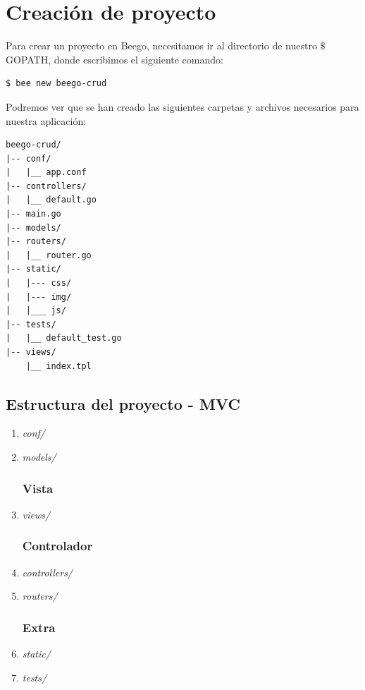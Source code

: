 \documentclass[12pt]{article}
\begin{document}
\section{Creación de proyecto}\label{sec:proy}
\noindent Para crear un proyecto en Beego, necesitamos ir al directorio de nuestro $\$$GOPATH, donde escribimos el siguiente comando:
\begin{verbatim}
$ bee new beego-crud
\end{verbatim}
\noindent Podremos ver que se han creado las siguientes carpetas y archivos necesarios para nuestra aplicación:

\begin{verbatim}
beego-crud/
|-- conf/
|   |__ app.conf
|-- controllers/
|   |__ default.go
|-- main.go
|-- models/
|-- routers/
|   |__ router.go
|-- static/
|   |--- css/
|   |--- img/
|   |___ js/
|-- tests/
|   |__ default_test.go
|-- views/
    |__ index.tpl
\end{verbatim}

\subsection{Estructura del proyecto - MVC}
\begin{enumerate}[1)]
  \subsubsection*{Modelo}
\item \textit{conf/}
\item \textit{models/}
  \subsubsection*{Vista}
\item \textit{views/}
  \subsubsection*{Controlador}
\item \textit{controllers/}
\item \textit{routers/}
  \subsubsection*{Extra}
\item \textit{static/}
\item \textit{tests/}

\end{enumerate}
\end{document}
